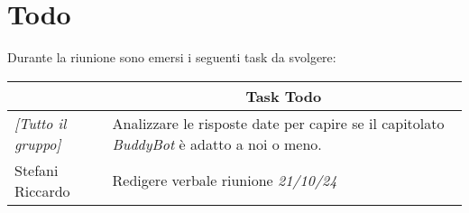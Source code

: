 \section{Todo}

Durante la riunione sono emersi i seguenti task da svolgere:

\vspace{0.5cm}

\begin{table}[htbp]
\begin{tabular}{|p{}|p{}|}
    \hline
    \rowcolor[gray]{0.9}
    \multicolumn{1}{|c|}{\textbf{Assegnatario}} & \multicolumn{1}{|c|}{\textbf{Task Todo}} \\
    \hline
    \emph{[Tutto il gruppo]} & Analizzare le risposte date per capire se il capitolato \emph{BuddyBot} è adatto a noi o meno. \\
    \hline
    Stefani Riccardo & Redigere verbale riunione \emph{21/10/24} \\
    \hline
\end{tabular}
\end{table}
